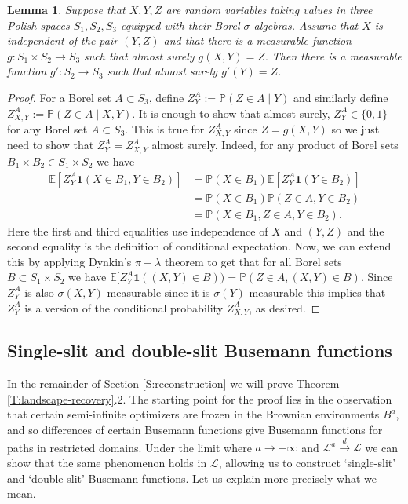 \documentclass[11pt]{article}
\newcommand{\E}{\mathbb{E}}
\newcommand{\sig}{\sigma}
\newcommand{\la}{\lambda}
\newcommand{\cL}{\mathcal{L}}
\newcommand{\cvgd}{\stackrel{d}{\to}}
\newcommand{\X}{\times}
\renewcommand{\P}{\mathbb{P}}
\newtheorem{lemma}[theorem]{Lemma}
\theoremstyle{definition} %
\theoremstyle{remark} %
\begin{document}
\begin{lemma}
	\label{L:independent-construction}
Suppose that $X, Y, Z$ are random variables taking values in three Polish spaces $S_1, S_2, S_3$ equipped with their Borel $\sig$-algebras. Assume that $X$ is independent of the pair $(Y, Z)$ and that there is a measurable function $g:S_1 \X S_2 \to S_3$ such that almost surely 
$
g(X, Y) = Z.
$
Then there is a measurable function $g':S_2 \to S_3$ such that almost surely $g'(Y) = Z$.
\end{lemma}

\begin{proof}
For a Borel set $A \subset S_3$, define $Z^A_Y := \P(Z \in A \mid Y)$ and similarly define $Z^A_{X, Y} := \P(Z \in A \mid X, Y)$.
It is enough to show that almost surely, $Z^A_Y \in \{0, 1\}$ for any Borel set $A \subset S_3$. This is true for $Z^A_{X, Y}$ since $Z = g(X, Y)$ so we just need to show that $Z^A_Y = Z^A_{X, Y}$ almost surely. Indeed, for any product of Borel sets $B_1 \X B_2 \in S_1 \X S_2$ we have
\begin{align*}
\E[Z^A_Y \mathbf{1}(X \in B_1, Y \in B_2)] &= \P(X \in B_1) \E[Z^A_Y \mathbf{1}(Y \in B_2)] \\
&= \P(X \in B_1)\P(Z \in A, Y \in B_2)\\
 &= \P(X \in B_1, Z \in A, Y \in B_2).
\end{align*}
Here the first and third equalities use independence of $X$ and $(Y, Z)$ and the second equality is the definition of conditional expectation. Now, we can extend this by applying Dynkin's $\pi-\la$ theorem to get that for all Borel sets $B \subset S_1 \X S_2$ we have $\E[Z^A_Y \mathbf{1}((X, Y) \in B)) = \P(Z \in A, (X, Y) \in B)$. Since $Z^A_Y$ is also $\sig(X, Y)$-measurable since it is $\sig(Y)$-measurable this implies that $Z^A_Y$ is a version of the conditional probability $Z^A_{X, Y}$, as desired.
\end{proof}

\subsection{Single-slit and double-slit Busemann functions}
\label{SS:slit}

In the remainder of Section \ref{S:reconstruction} we will prove Theorem \ref{T:landscape-recovery}.2. The starting point for the proof lies in the observation that certain semi-infinite optimizers are frozen in the Brownian environments $B^a$, and so differences of certain Busemann functions give Busemann functions for paths in restricted domains. Under the limit where $a \to -\infty$ and $\cL^a \cvgd \cL$ we can show that the same phenomenon holds in $\cL$, allowing us to construct `single-slit' and `double-slit' Busemann functions. Let us explain more precisely what we mean.
\end{document}

